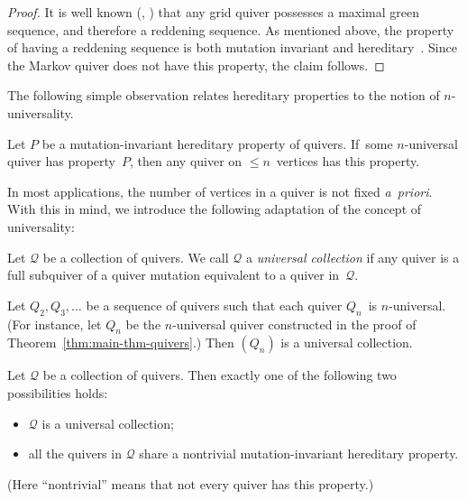 \begin{proof}
It is well known (\cf \cite[Section~1]{marsh-scott}, \cite[Section~5]{keller-maxgreen}) that any grid quiver possesses a maximal green sequence, and therefore a reddening sequence. As mentioned above, the property of having a reddening sequence is both mutation invariant and hereditary~\cite[\emph{loc.\ cit.}]{muller-max-green}. Since the Markov quiver does not have this property, the claim follows. 
\end{proof}

The following simple observation relates hereditary properties to the notion of $n$-universality. 


\begin{remark}
\label{rem:enough-n-universal}
Let $P$ be a mutation-invariant hereditary property of quivers. 
If~some $n$-universal quiver has property~$P$, then any quiver on $\le n$~vertices has this property.
\end{remark}

In most applications, the number of vertices in a quiver is not fixed \emph{a~priori}. With this in mind, we introduce the following adaptation of the concept of universality: 

\begin{definition}
\label{def:universal-collection}
Let $\mathcal{Q}$ be a collection of quivers. We call $\mathcal{Q}$ a \emph{universal collection} if any quiver is a full subquiver of a quiver mutation equivalent to a quiver in~$\mathcal{Q}$. 
\end{definition}


\begin{remark}
\label{rem:universal-from-n-universal}
Let $Q_2, Q_3,\dots$ be a sequence of quivers such that each quiver $Q_n$~is \hbox{$n$-universal}. (For instance, let $Q_n$ be the $n$-universal quiver constructed in the proof of Theorem~\ref{thm:main-thm-quivers}.) Then $(Q_n)$ is a universal collection. 
\end{remark}


\begin{proposition}
\label{prop:universal-hereditary-alternative}
Let $\mathcal{Q}$ be a collection of quivers. Then exactly one of the following two possibilities holds:
\begin{itemize}%
\item
$\mathcal{Q}$ is a universal collection; 
\item
all the quivers in $\mathcal{Q}$ share a nontrivial mutation-invariant hereditary property.
\end{itemize}
(Here ``nontrivial'' means that not every quiver has this property.) 
\end{proposition}

